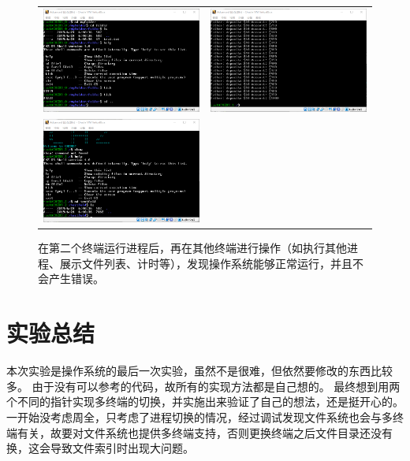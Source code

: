 \documentclass[logo,reportComp]{thesis}
\begin{document}
\begin{figure}[H]
\centering
\begin{tabular}{cc}
\includegraphics[width=0.5\linewidth]{fig/term_1-after.png}&
\includegraphics[width=0.5\linewidth]{fig/term_2-after.png}\\
\includegraphics[width=0.5\linewidth]{fig/term_3-after.png}
\end{tabular}
\caption{在第二个终端运行进程后，再在其他终端进行操作（如执行其他进程、展示文件列表、计时等），发现操作系统能够正常运行，并且不会产生错误。}
\label{fig:terminal-after}
\end{figure}

\section{实验总结}
本次实验是操作系统的最后一次实验，虽然不是很难，但依然要修改的东西比较多。
由于没有可以参考的代码，故所有的实现方法都是自己想的。
最终想到用两个不同的指针实现多终端的切换，并实施出来验证了自己的想法，还是挺开心的。
一开始没考虑周全，只考虑了进程切换的情况，经过调试发现文件系统也会与多终端有关，故要对文件系统也提供多终端支持，否则更换终端之后文件目录还没有换，这会导致文件索引时出现大问题。
\end{document}
